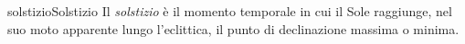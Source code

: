 \documentclass[preview]{standalone}
\begin{document}
\begin{snippetdefinition}{solstizio}{Solstizio}
    Il \textit{solstizio} è il momento temporale in
    cui il Sole raggiunge, nel suo moto apparente lungo l'eclittica,
    il punto di declinazione massima o minima.
\end{snippetdefinition}


\end{document}
